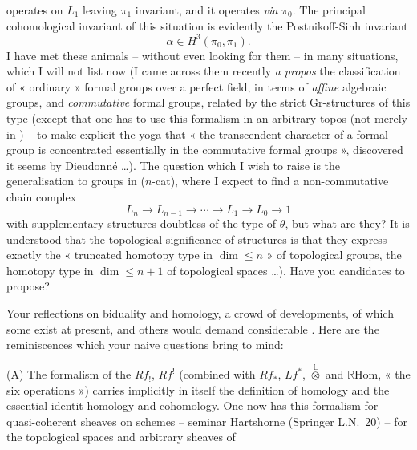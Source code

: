 \documentclass[11pt,a4paper]{article}
\begin{document}
operates on $L_1$ leaving $\pi_1$ invariant, and it operates \emph{via} $\pi_0$. The principal cohomological invariant of this situation is evidently the Postnikoff-Sinh invariant
\[
\alpha \in H^3(\pi_0, \pi_1) .
\]
I have met these animals -- without even looking for them -- in many situations, which I will not list now (I came across them recently \emph{a propos} the classification of « ordinary » formal groups over a perfect field, in terms of \emph{affine} algebraic groups, and \emph{commutative} formal groups, related by the strict Gr-structures of this type (except that one has to use this formalism in an arbitrary topos (not merely in \struck{\ill{}} ) -- to make explicit the yoga that « the transcendent character of a formal group is concentrated essentially in the commutative formal groups », discovered it seems by Dieudonné …). The question which I wish to raise is the generalisation to groups in ($n$-cat), where I expect to find a non-commutative chain complex
\[
L_n \to L_{n-1} \to \cdots \to L_1 \to L_0 \to 1
\]
with supplementary structures doubtless of the type of $\theta$, but what are they? It is understood that the topological significance of   structures is that they express exactly the « truncated homotopy type in $\dim \leqslant n$ » of topological groups,   the homotopy type in $\dim \leqslant n+1$ of   topological spaces …). Have you candidates to propose?

Your reflections on biduality and homology,   a crowd of developments, of which  some  exist at present, and others would demand  considerable  . Here are the reminiscences which your naive questions bring to mind:

(A) The formalism of the $Rf_!$, $Rf^!$ (combined with $Rf_*$, $Lf^*$, $\overset{\mathbb{L}}{\otimes}$ and $\mathbb{R}\mathrm{Hom}$, « the six operations ») carries implicitly in itself the definition of homology and the essential identit homology and cohomology. One now has this formalism for quasi-coherent sheaves on schemes -- seminar Hartshorne (Springer L.N.~20) -- for the topological spaces and arbitrary sheaves of
\end{document}
